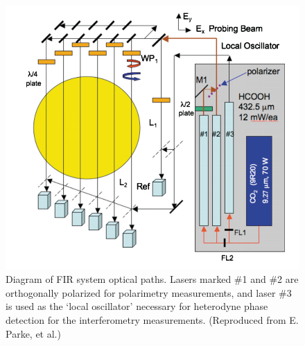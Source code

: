 \begin{figure}[!htb]
	\centering
	\includegraphics[width = 0.9\linewidth]{./implementation/fir_optics_diagram.PNG}
	\caption[Diagram of FIR optical paths]{Diagram of FIR system optical paths. Lasers marked \#1 and \#2 are orthogonally polarized for polarimetry measurements, and laser \#3 is used as the `local oscillator' necessary for heterodyne phase detection for the interferometry measurements. (Reproduced from E. Parke, et al.\cite{Parke2016})}
    \label{fig:fir_optics_diagram} 
\end{figure}

